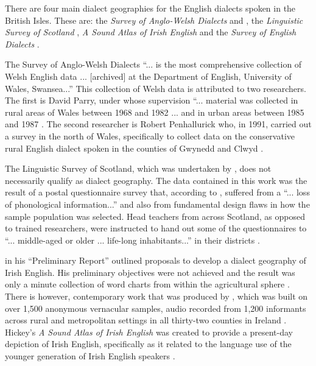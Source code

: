 There are four main dialect geographies for the English dialects spoken in the British Isles. These are: the \emph{Survey of Anglo-Welsh Dialects} \citep{Parry77, Parry79} and \citet{Penhallurick91}, the \emph{Linguistic Survey of Scotland} \citep{Mather75}, \emph{A Sound Atlas of Irish English} \citep{Hickey04} and the \emph{Survey of English Dialects} \citep{Orton6271}.

The Survey of Anglo-Welsh Dialects ``... is the most comprehensive collection of Welsh English data ... [archived] at the Department of English, University of Wales, Swansea...'' This collection of Welsh data is attributed to two researchers. The first is David Parry, under whose supervision ``... material was collected in rural areas of Wales between 1968 and 1982 ... and in urban areas between 1985 and 1987 \citep[100]{Penhallurick04}. The second researcher is Robert Penhallurick who, in 1991, carried out a survey in the north of Wales, specifically to collect data on the conservative rural English dialect spoken in the counties of Gwynedd and Clwyd \citep{Penhallurick91}.

The Linguistic Survey of Scotland, which was undertaken by  \citet{Mather75}, does not necessarily qualify as dialect geography. The data contained in this work was the result of a postal questionnaire survey that, according to  \citet[225]{Macaulay77}, suffered from a ``... loss of phonological information...'' and also from fundamental design flaws in how the sample population was selected. Head teachers from across Scotland, as opposed to trained researchers, were instructed to hand out some of the questionnaires to ``... middle-aged or older ... life-long inhabitants...'' in their districts \citep[14]{Macaulay77}.

\citet{Henry58} in his ``Preliminary Report'' outlined proposals to develop a dialect geography of Irish English. His preliminary objectives were not achieved and the result was only a minute collection of word charts from within the agricultural sphere \citep{Corrigan10}. There is however, contemporary work that was produced by \citet{Hickey04}, which was built on over 1,500 anonymous vernacular samples, audio recorded from 1,200 informants across rural and metropolitan settings in all thirty-two counties in Ireland \citep{Corrigan10, Hickey04}. Hickey's \emph{A Sound Atlas of Irish English} was created to provide a present-day depiction of Irish English, specifically as it related to the language use of the younger generation of Irish English speakers \citep{Hickey04}.

